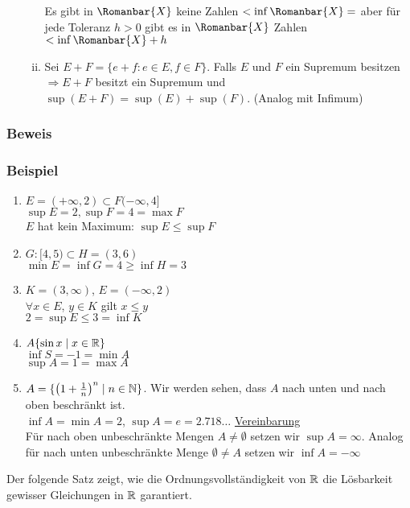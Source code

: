 \begin{enumerate}
\begin{enumerate}[(i)]
\begin{center}
\end{center}



Es gibt in $\Romanbar{X}$ keine Zahlen $<\inf\Romanbar{X}=$ aber für jede Toleranz $h>0$ gibt es in $\Romanbar{X}$ Zahlen $<\inf \Romanbar{X}+h$
\item Sei $E+F=\{ e+f:e\in E,f\in F\}$. Falls $E$ und $F$ ein Supremum besitzen $\Rightarrow E+F$ besitzt ein Supremum und $\sup (E+F)=\sup(E)+\sup(F)$. (Analog mit Infimum)
\end{enumerate}
\end{enumerate}
\subsubsection*{Beweis}
\subsubsection*{Beispiel}
\begin{enumerate}
\item $E=(+\infty,2)\subset F(-\infty,4\rbrack$\\
$\sup E=2, \sup F=4=\max F$\\
$E$ hat kein Maximum: $\sup E\leq \sup F$
\item $G:\lbrack 4,5)\subset H=(3,6)$\\
$\min E=\inf G=4\geq \inf H=3$
\item $K=(3,\infty)$, $E=(-\infty,2)$\\
$\forall x\in E$, $y\in K$ gilt $x\leq y$\\
$2=\sup E\leq 3=\inf K$
\item $A\{\sin x\mid x\in\mathbb{R}\}$\\
$\inf S=-1=\min A$\\
$\sup A=1=\max A$
\item $A=\{\left( 1+\frac{1}{n}\right)^n\mid n\in\mathbb{N} \}$. Wir werden sehen, dass $A$ nach unten und nach oben beschränkt ist. \\
$\inf A=\min A=2$, $\sup A=e=2.718\dots$
\underline{Vereinbarung}\\
Für nach oben unbeschränkte Mengen $A\not=\emptyset$ setzen wir $\sup A=\infty$. Analog für nach unten unbeschränkte Menge $\emptyset\not= A$ setzen wir $\inf A=-\infty$
\end{enumerate}
Der folgende Satz zeigt, wie die Ordnungsvollständigkeit von $\mathbb{R}$ die Lösbarkeit gewisser Gleichungen in $\mathbb{R}$ garantiert.

